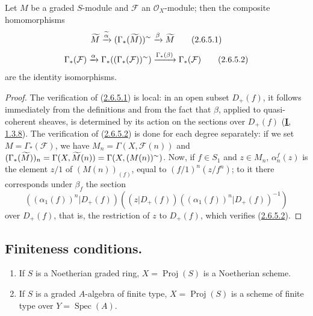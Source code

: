 \begin{proposition}[2.6.5]
\label{II.2.6.5}
Let $M$ be a graded $S$-module and $\mathcal{F}$ an $\mathcal{O}_X$-module;
then the composite homomorphisms
\[
\label{II.2.6.5.1}
  \widetilde{M}\xrightarrow{\widetilde{\alpha}}
  (\Gamma_*(\widetilde{M}))^{\sim}
  \xrightarrow{\beta}\widetilde{M}
\tag{2.6.5.1}
\]
\[
\label{II.2.6.5.2}
  \Gamma_*(\mathcal{F})\xrightarrow{\alpha}
  \Gamma_*((\Gamma_*(\mathcal{F}))^{\sim})
  \xrightarrow{\Gamma_*(\beta)}\Gamma_*(\mathcal{F})
\tag{2.6.5.2}
\]
are the identity isomorphisms.
\end{proposition}

\begin{proof}
The verification of (\hyperref[II.2.6.5.1]{2.6.5.1}) is local: in an
open subset $D_+(f)$, it follows immediately from the definitions and from
the fact that $\beta$, applied to quasi-coherent sheaves, is determined by
its action on the sections over $D_+(f)$ (\hyperref[I.1.3.8]{\textbf{I}, 1.3.8}).
The verification of (\hyperref[II.2.6.5.2]{2.6.5.2}) is done for each
degree separately: if we set $M=\Gamma_*(\mathcal{F})$, we have
$M_n=\Gamma(X,\mathcal{F}(n))$ and
$(\Gamma_*(\widetilde{M}))_n=\Gamma(X,\widetilde{M}(n))
=\Gamma(X,(M(n))^{\sim})$. Now, if $f\in S_1$ and $z\in M_n$,
$\alpha_n^f(z)$ is the element $z/1$ of $(M(n))_{(f)}$, equal to
$(f/1)^n(z/f^n)$; to it there corresponds under $\beta_f$ the section
\[
  ((\alpha_1(f))^n|D_+(f))
  ((z|D_+(f))((\alpha_1(f))^n|D_+(f))^{-1})
\]
over $D_+(f)$, that is, the restriction of $z$ to $D_+(f)$, which
verifies (\hyperref[II.2.6.5.2]{2.6.5.2}).
\end{proof}


\subsection{Finiteness conditions.}
\label{subsection:II.2.7}

\begin{proposition}[2.7.1]
\label{II.2.7.1}
\begin{enumerate}
  \item[\rm(i)] If $S$ is a Noetherian graded ring,
    $X=\operatorname{Proj}(S)$ is a Noetherian scheme.
  \item[\rm(ii)] If $S$ is a graded $A$-algebra of finite type,
    $X=\operatorname{Proj}(S)$ is a scheme of finite type over
    $Y=\operatorname{Spec}(A)$.
\end{enumerate}
\end{proposition}

